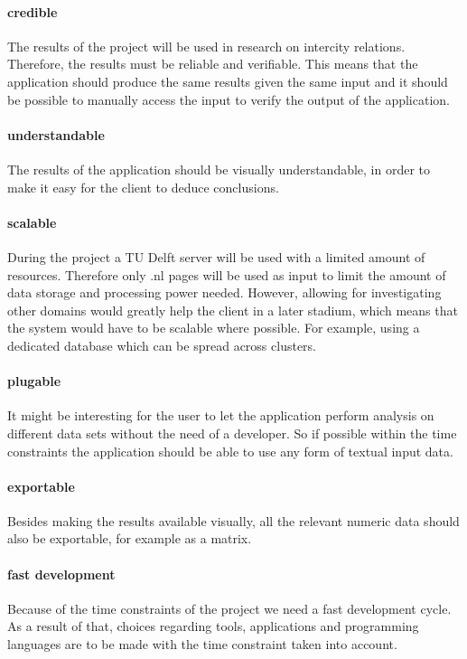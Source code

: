 \paragraph{credible} The results of the project will be used in research on intercity relations. Therefore, the results must be reliable and verifiable. This means that the application should produce the same results given the same input and it should be possible to manually access the input to verify the output of the application.
\paragraph{understandable} The results of the application should be visually understandable, in order to make it easy for the client to deduce conclusions. 
\paragraph{scalable} During the project a TU Delft server will be used with a limited amount of resources. Therefore only .nl pages will be used as input to limit the amount of data storage and processing power needed. However, allowing for investigating other domains would greatly help the client in a later stadium, which means that the system would have to be scalable where possible. For example, using a dedicated database which can be spread across clusters.
\paragraph{plugable} It might be interesting for the user to let the application perform analysis on different data sets without the need of a developer. So if possible within the time constraints the application should be able to use any form of textual input data.
\paragraph{exportable} Besides making the results available visually, all the relevant numeric data should also be exportable, for example as a matrix.
\paragraph{fast development} Because of the time constraints of the project we need a fast development cycle. As a result of that, choices regarding tools, applications and programming languages are to be made with the time constraint taken into account.


